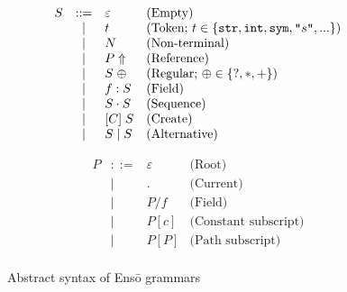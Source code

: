 \documentclass[a4paper]{article}
\def\enso{Ens\={o}\xspace}
\begin{document}
\def\literal#1{\ensuremath{\text{\texttt{"}}#1\text{\texttt{"}}}}

\begin{figure}
\begin{minipage}[t]{0.5\textwidth}
\[
\begin{array}{rcll}
S & ::= & \varepsilon & \text{(Empty)} \\
  & \mid & t & \text{(Token; } t\in\{\text{\texttt{str}}, \text{\texttt{int}}, \text{\texttt{sym}}, \literal{s},... \}\text{)} \\
  & \mid & N & \text{(Non-terminal)}\\
  & \mid & P\Uparrow & \text{(Reference)}\\
  & \mid & S\;\oplus & \text{(Regular; }\oplus\in\{?,*,+\}\text{)}\\ 
  & \mid & f:S & \text{(Field)}\\
  & \mid & S\cdot S & \text{(Sequence)}\\
  & \mid & [C]\; S & \text{(Create)}\\
  & \mid & S \mid S & \text{(Alternative)}\\
\end{array}
\]
\end{minipage}
\begin{minipage}[t]{0.5\textwidth}
\[
\begin{array}{rcll}
P & ::= & \varepsilon & \text{(Root)}\\
  & \mid & . & \text{(Current)}\\
  & \mid & P / f & \text{(Field)}\\
  & \mid & P [c] & \text{(Constant subscript)}\\
  & \mid & P [P] & \text{(Path subscript)}\\
\end{array}
\]
\end{minipage}
\caption{Abstract syntax of \enso grammars\label{FIG:metasyntax}}
\end{figure}
\end{document}

